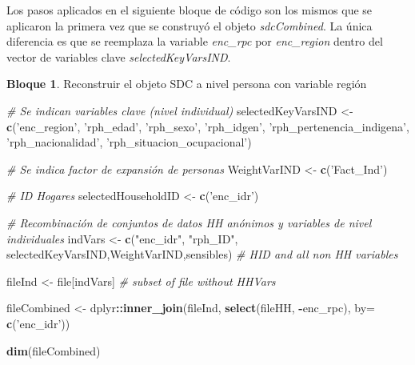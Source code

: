 \documentclass[]{book}
\newenvironment{Shaded}{\begin{snugshade}}{\end{snugshade}}
\newcommand{\CommentTok}[1]{\textcolor[rgb]{0.56,0.35,0.01}{\textit{#1}}}
\newcommand{\DataTypeTok}[1]{\textcolor[rgb]{0.13,0.29,0.53}{#1}}
\newcommand{\KeywordTok}[1]{\textcolor[rgb]{0.13,0.29,0.53}{\textbf{#1}}}
\newcommand{\NormalTok}[1]{#1}
\newcommand{\OperatorTok}[1]{\textcolor[rgb]{0.81,0.36,0.00}{\textbf{#1}}}
\newcommand{\StringTok}[1]{\textcolor[rgb]{0.31,0.60,0.02}{#1}}
\theoremstyle{definition}
\theoremstyle{definition}
\newtheorem{example}{Bloque}[chapter]
\theoremstyle{definition}
\theoremstyle{definition}
\theoremstyle{remark}
\begin{document}
Los pasos aplicados en el siguiente bloque de código son los mismos que se aplicaron la primera vez que se construyó el objeto \emph{sdcCombined}. La única diferencia es que se reemplaza la variable \emph{enc\_rpc} por \emph{enc\_region} dentro del vector de variables clave \emph{selectedKeyVarsIND}.

\begin{example}
\protect\hypertarget{exm:bloque58nbm}{}{\label{exm:bloque58nbm} }Reconstruir el objeto SDC a nivel persona con variable región
\end{example}

\begin{Shaded}
\begin{Highlighting}[]
\CommentTok{# Se indican variables clave (nivel individual)}
\NormalTok{selectedKeyVarsIND <-}\StringTok{ }\KeywordTok{c}\NormalTok{(}\StringTok{'enc_region'}\NormalTok{,}
                        \StringTok{'rph_edad'}\NormalTok{,}
                        \StringTok{'rph_sexo'}\NormalTok{,}
                        \StringTok{'rph_idgen'}\NormalTok{,}
                        \StringTok{'rph_pertenencia_indigena'}\NormalTok{, }
                       \StringTok{'rph_nacionalidad'}\NormalTok{,}
                       \StringTok{'rph_situacion_ocupacional'}\NormalTok{) }

\CommentTok{# Se indica factor de expansión de personas}
\NormalTok{WeightVarIND <-}\StringTok{ }\KeywordTok{c}\NormalTok{(}\StringTok{'Fact_Ind'}\NormalTok{)}

\CommentTok{# ID Hogares}
\NormalTok{selectedHouseholdID <-}\StringTok{ }\KeywordTok{c}\NormalTok{(}\StringTok{'enc_idr'}\NormalTok{)}

\CommentTok{# Recombinación de conjuntos de datos HH anónimos y variables de nivel individuales}
\NormalTok{indVars <-}\StringTok{ }\KeywordTok{c}\NormalTok{(}\StringTok{"enc_idr"}\NormalTok{, }\StringTok{"rph_ID"}\NormalTok{, selectedKeyVarsIND,WeightVarIND,sensibles) }\CommentTok{# HID and all non HH variables}

\NormalTok{fileInd <-}\StringTok{ }\NormalTok{file[indVars] }\CommentTok{# subset of file without HHVars}

\NormalTok{fileCombined <-}\StringTok{ }\NormalTok{dplyr}\OperatorTok{::}\KeywordTok{inner_join}\NormalTok{(fileInd, }\KeywordTok{select}\NormalTok{(fileHH, }\OperatorTok{-}\NormalTok{enc_rpc), }\DataTypeTok{by=} \KeywordTok{c}\NormalTok{(}\StringTok{'enc_idr'}\NormalTok{))}

\KeywordTok{dim}\NormalTok{(fileCombined)}
\end{Highlighting}
\end{Shaded}
\end{document}

